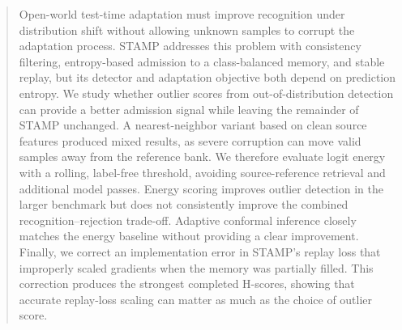 \begin{abstract}
Open-world test-time adaptation must improve recognition under distribution
shift without allowing unknown samples to corrupt the adaptation process.
STAMP addresses this problem with consistency filtering, entropy-based
admission to a class-balanced memory, and stable replay, but its detector and
adaptation objective both depend on prediction entropy. We study whether
outlier scores from out-of-distribution detection can provide a better
admission signal while leaving the remainder of STAMP unchanged. A
nearest-neighbor variant based on clean source features produced mixed results,
as severe corruption can move valid samples away from the reference bank. We
therefore evaluate logit energy with a rolling, label-free threshold, avoiding
source-reference retrieval and additional model passes. Energy scoring improves
outlier detection in the larger benchmark but does not consistently improve the
combined recognition--rejection trade-off. Adaptive conformal inference closely
matches the energy baseline without providing a clear improvement. Finally, we
correct an implementation error in STAMP's replay loss that improperly scaled
gradients when the memory was partially filled. This correction produces the
strongest completed H-scores, showing that accurate replay-loss scaling can
matter as much as the choice of outlier score.
\end{abstract}
